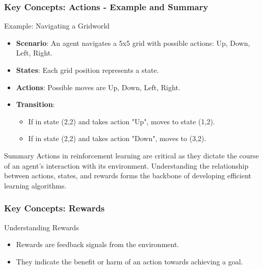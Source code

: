 \documentclass{beamer}
\begin{document}
\begin{frame}[fragile]
    \frametitle{Key Concepts: Actions - Example and Summary}
    \begin{block}{Example: Navigating a Gridworld}
        \begin{itemize}
            \item \textbf{Scenario}: An agent navigates a 5x5 grid with possible actions: Up, Down, Left, Right.
            \item \textbf{States}: Each grid position represents a state.
            \item \textbf{Actions}: Possible moves are Up, Down, Left, Right.
            \item \textbf{Transition}: 
            \begin{itemize}
                \item If in state (2,2) and takes action "Up", moves to state (1,2).
                \item If in state (2,2) and takes action "Down", moves to (3,2).
            \end{itemize}
        \end{itemize}
    \end{block}
    
    \begin{block}{Summary}
        Actions in reinforcement learning are critical as they dictate the course of an agent's interaction with its environment. 
        Understanding the relationship between actions, states, and rewards forms the backbone of developing efficient learning algorithms.
    \end{block}
\end{frame}

\begin{frame}[fragile]
    \frametitle{Key Concepts: Rewards}
    \begin{block}{Understanding Rewards}
        \begin{itemize}
            \item Rewards are feedback signals from the environment.
            \item They indicate the benefit or harm of an action towards achieving a goal.
        \end{itemize}
    \end{block}
\end{frame}
\end{document}
